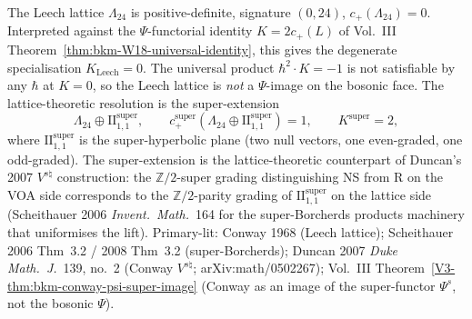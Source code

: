\begin{remark}
\label{rem:latfnd-w19-witten-leech-positive-face}
The Leech lattice $\Lambda_{24}$ is positive-definite, signature
$(0, 24)$, $c_+(\Lambda_{24}) = 0$. Interpreted against the
$\Psi$-functorial identity $K = 2c_+(L)$ of
Vol.~III Theorem~\ref{thm:bkm-W18-universal-identity}, this gives
the degenerate specialisation $K_{\mathrm{Leech}} = 0$. The
universal product $\hbar^2\cdot K = -1$ is not satisfiable by any
$\hbar$ at $K = 0$, so the Leech lattice is \emph{not} a
$\Psi$-image on the bosonic face. The lattice-theoretic resolution
is the super-extension
\[
 \Lambda_{24}\oplus\mathrm{II}_{1,1}^{\mathrm{super}},
 \qquad
 c_+^{\mathrm{super}}(\Lambda_{24}\oplus\mathrm{II}_{1,1}^{\mathrm{super}}) = 1,
 \qquad
 K^{\mathrm{super}} = 2,
\]
where $\mathrm{II}_{1,1}^{\mathrm{super}}$ is the super-hyperbolic
plane (two null vectors, one even-graded, one odd-graded). The
super-extension is the lattice-theoretic counterpart of Duncan's
2007 $V^{s\natural}$ construction: the $\mathbb{Z}/2$-super grading
distinguishing NS from R on the VOA side corresponds to the
$\mathbb{Z}/2$-parity grading of
$\mathrm{II}_{1,1}^{\mathrm{super}}$ on the lattice side
(Scheithauer 2006 \emph{Invent.\ Math.}~164 for the super-Borcherds
products machinery that uniformises the lift).
Primary-lit: Conway 1968 (Leech lattice);
Scheithauer 2006 Thm~3.2 / 2008 Thm~3.2 (super-Borcherds);
Duncan 2007 \emph{Duke Math.\ J.}~139, no.~2
(Conway $V^{s\natural}$; arXiv:math/0502267);
Vol.~III Theorem~\ref{V3-thm:bkm-conway-psi-super-image}
(Conway as an image of the super-functor $\Psi^{s}$, not the
bosonic $\Psi$).
\end{remark}

